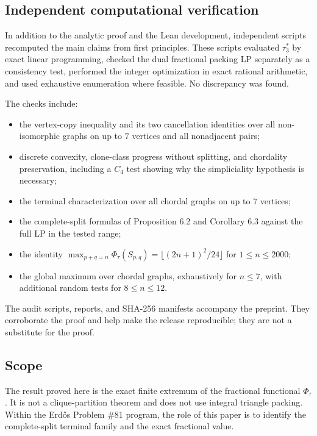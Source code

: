 \documentclass[
  11pt,
]{article}
\providecommand{\tightlist}{%
  \setlength{\itemsep}{0pt}\setlength{\parskip}{0pt}}
\begin{document}
\subsection{Independent computational
verification}\label{independent-computational-verification}

In addition to the analytic proof and the Lean development, independent
scripts recomputed the main claims from first principles. These scripts
evaluated \(\tau_3^*\) by exact linear programming, checked the dual
fractional packing LP separately as a consistency test, performed the
integer optimization in exact rational arithmetic, and used exhaustive
enumeration where feasible. No discrepancy was found.

The checks include:

\begin{itemize}
\tightlist
\item
  the vertex-copy inequality and its two cancellation identities over
  all non-isomorphic graphs on up to \(7\) vertices and all nonadjacent
  pairs;
\item
  discrete convexity, clone-class progress without splitting, and
  chordality preservation, including a \(C_4\) test showing why the
  simpliciality hypothesis is necessary;
\item
  the terminal characterization over all chordal graphs on up to \(7\)
  vertices;
\item
  the complete-split formulas of Proposition 6.2 and Corollary 6.3
  against the full LP in the tested range;
\item
  the identity
  \(\max_{p+q=n}\Phi_\tau(S_{p,q})=\lfloor(2n+1)^2/24\rfloor\) for
  \(1\le n\le2000\);
\item
  the global maximum over chordal graphs, exhaustively for \(n\le7\),
  with additional random tests for \(8\le n\le12\).
\end{itemize}

The audit scripts, reports, and SHA-256 manifests accompany the
preprint. They corroborate the proof and help make the release
reproducible; they are not a substitute for the proof.

\subsection{Scope}\label{scope}

The result proved here is the exact finite extremum of the fractional
functional \(\Phi_\tau\). It is not a clique-partition theorem and does
not use integral triangle packing. Within the Erdős Problem \#81
program, the role of this paper is to identify the complete-split
terminal family and the exact fractional value.
\end{document}
